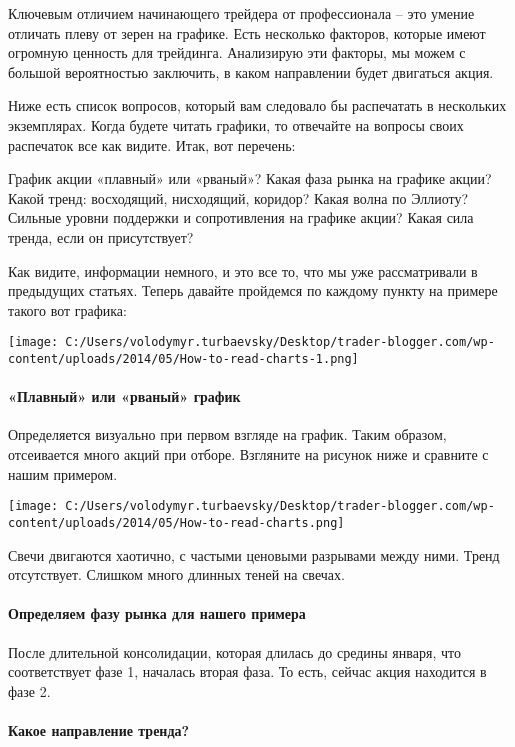 \documentclass[a5paper]{article}
\begin{document}
Ключевым отличием начинающего трейдера от профессионала – это умение отличать плеву от зерен на графике. Есть несколько факторов, которые имеют огромную ценность для трейдинга. Анализирую эти факторы, мы можем с большой вероятностью заключить, в каком направлении будет двигаться акция.

Ниже есть список вопросов, который вам следовало бы распечатать в нескольких экземплярах. Когда будете читать графики, то отвечайте на вопросы своих распечаток все как видите. Итак, вот перечень:

    График акции «плавный» или «рваный»?
    Какая фаза рынка на графике акции?
    Какой тренд: восходящий, нисходящий, коридор?
    Какая волна по Эллиоту?
    Сильные уровни поддержки и сопротивления на графике акции?
    Какая сила тренда, если он присутствует?

Как видите, информации немного, и это все то, что мы уже рассматривали
в предыдущих статьях. Теперь давайте пройдемся по каждому пункту на
примере такого вот графика:

\texttt{[image: C:/Users/volodymyr.turbaevsky/Desktop/trader-blogger.com/wp-content/uploads/2014/05/How-to-read-charts-1.png]}

\paragraph{«Плавный» или «рваный» график}

Определяется визуально при первом взгляде на график. Таким образом, отсеивается много акций при отборе. Взгляните на рисунок ниже и сравните с нашим примером.

\texttt{[image: C:/Users/volodymyr.turbaevsky/Desktop/trader-blogger.com/wp-content/uploads/2014/05/How-to-read-charts.png]}

Свечи двигаются хаотично, с частыми ценовыми разрывами между
ними. Тренд отсутствует. Слишком много длинных теней на свечах.

\paragraph{Определяем фазу рынка для нашего примера}

После длительной консолидации, которая длилась до средины января, что
соответствует фазе 1, началась вторая фаза. То есть, сейчас акция
находится в фазе 2.

\paragraph{Какое направление тренда?}
\end{document}
